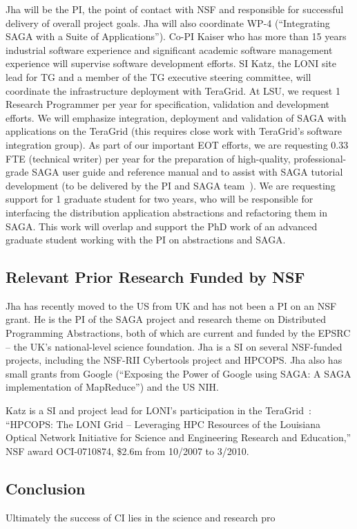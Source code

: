 \documentclass[10pt,letterpaper]{article}
\begin{document}
Jha will be the PI, the point of contact with NSF and responsible for
successful delivery of overall project goals. Jha will also coordinate
WP-4 (``Integrating SAGA with a Suite of Applications''). Co-PI Kaiser
who has more than 15 years industrial software experience and
significant academic software management experience will supervise
software development efforts. SI Katz, the LONI site lead for TG and a
member of the TG executive steering committee, will coordinate the
infrastructure deployment with TeraGrid.  At LSU, we request 1
Research Programmer per year for specification, validation and
development efforts. We will emphasize integration, deployment and
validation of SAGA with applications on the TeraGrid (this requires
close work with TeraGrid's software integration group).  As part of
our important EOT efforts, we are requesting 0.33 FTE (technical
writer) per year for the preparation of high-quality,
professional-grade SAGA user guide and reference manual and to assist
with SAGA tutorial development (to be delivered by the PI and SAGA
team~\cite{eot_url1, eot_url2, eot_url3}). We are requesting support
for 1 graduate student for two years, who will be responsible for
interfacing the distribution application abstractions and refactoring
them in SAGA.  This work will overlap and support the PhD work of an
advanced graduate student working with the PI on abstractions and
SAGA.


\subsection*{Relevant Prior Research Funded by NSF}

Jha has recently moved to the US from UK and has not been a PI on an
NSF grant. He is the PI of the SAGA project and research theme on
Distributed Programming Abstractions, both of which are current and
funded by the EPSRC -- the UK's national-level science foundation.
Jha is a SI on several NSF-funded projects, including the NSF-RII
Cybertools project and HPCOPS. Jha also has small grants from Google
(``Exposing the Power of Google using SAGA: A SAGA implementation of
MapReduce'') and the US NIH.%

Katz is a SI and project lead for LONI's participation in the
TeraGrid~\cite{teragrid}: ``HPCOPS: The LONI Grid -- Leveraging HPC
Resources of the Louisiana Optical Network Initiative for Science and
Engineering Research and Education,'' NSF award OCI-0710874, \$2.6m from
10/2007 to 3/2010.

\subsection*{Conclusion}

Ultimately the success of CI lies in the science and research pro
\newpage
\setcounter{page}{1}
\pagestyle{plain} 



\end{document}
